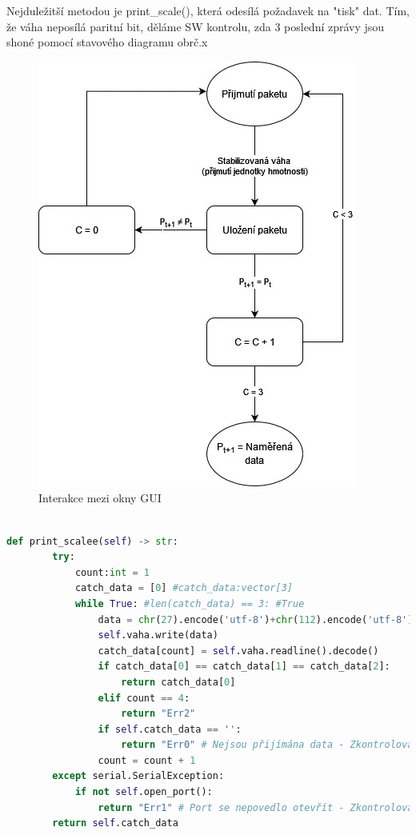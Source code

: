 Nejduležitší metodou je print\_scale(), která odesílá požadavek na "tisk" dat. Tím, že váha neposílá paritní bit, děláme SW kontrolu, zda 3 poslední zprávy jsou shoné pomocí stavového diagramu obrč.x
\begin{figure}[H]
    \begin{center}
        \includegraphics[scale=0.6]{obrazky/stavovy_automat_parita.jpg}
    \end{center}
    \caption{Interakce mezi okny GUI}
    \label{Interakce mezi okny GUI}
\end{figure}

\begin{lstlisting}[language=Python, caption=Funkce stavového automatu:, frame=single, breaklines=true, postbreak=\mbox{\textcolor{gray}{$\hookrightarrow$}\space}]

def print_scalee(self) -> str:
        try:
            count:int = 1
            catch_data = [0] #catch_data:vector[3]
            while True: #len(catch_data) == 3: #True
                data = chr(27).encode('utf-8')+chr(112).encode('utf-8')
                self.vaha.write(data)
                catch_data[count] = self.vaha.readline().decode()
                if catch_data[0] == catch_data[1] == catch_data[2]:
                    return catch_data[0]
                elif count == 4:
                    return "Err2"
                if self.catch_data == '':
                    return "Err0" # Nejsou přijímána data - Zkontrolovat připojení váhy
                count = count + 1
        except serial.SerialException:
            if not self.open_port():
                return "Err1" # Port se nepovedlo otevřít - Zkontrolovat připojení váhy
        return self.catch_data
\end{lstlisting}

